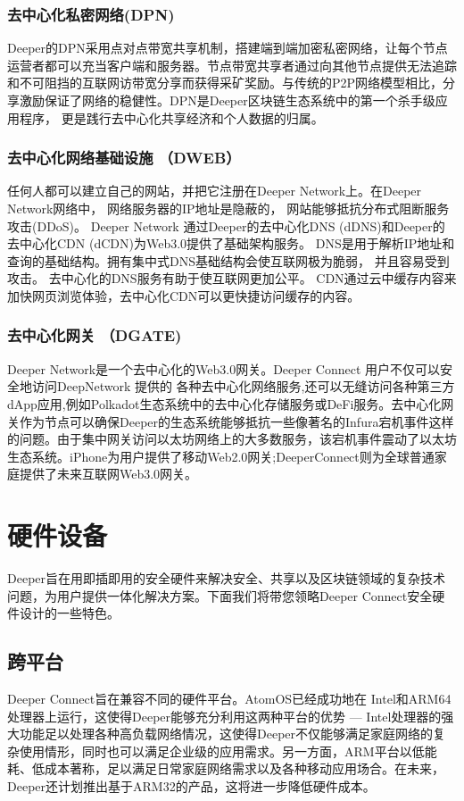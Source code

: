 \documentclass[a4paper]{article}
\begin{document}
\subsubsection{去中心化私密网络(DPN)}
Deeper的DPN采用点对点带宽共享机制，搭建端到端加密私密网络，让每个节点运营者都可以充当客户端和服务器。节点带宽共享者通过向其他节点提供无法追踪和不可阻挡的互联网访带宽分享而获得采矿奖励。与传统的P2P网络模型相比，分享激励保证了网络的稳健性。DPN是Deeper区块链生态系统中的第一个杀手级应用程序， 更是践行去中心化共享经济和个人数据的归属。


\subsubsection{去中心化网络基础设施 （DWEB）}
任何人都可以建立自己的网站，并把它注册在Deeper Network上。在Deeper Network网络中， 网络服务器的IP地址是隐蔽的， 网站能够抵抗分布式阻断服务攻击(DDoS)。 Deeper Network 通过Deeper的去中心化DNS (dDNS)和Deeper的去中心化CDN (dCDN)为Web3.0提供了基础架构服务。 DNS是用于解析IP地址和查询的基础结构。拥有集中式DNS基础结构会使互联网极为脆弱， 并且容易受到攻击。 去中心化的DNS服务有助于使互联网更加公平。 CDN通过云中缓存内容来加快网页浏览体验，去中心化CDN可以更快捷访问缓存的内容。

\subsubsection{去中心化网关 （DGATE)}
Deeper Network是一个去中心化的Web3.0网关。Deeper Connect 用户不仅可以安全地访问DeepNetwork 提供的
各种去中心化网络服务,还可以无缝访问各种第三方dApp应用,例如Polkadot生态系统中的去中心化存储服务或DeFi服务。去中心化网关作为节点可以确保Deeper的生态系统能够抵抗一些像著名的Infura宕机事件这样的问题。由于集中网关访问以太坊网络上的大多数服务，该宕机事件震动了以太坊生态系统。iPhone为用户提供了移动Web2.0网关;DeeperConnect则为全球普通家庭提供了未来互联网Web3.0网关。

\newpage
\section{硬件设备}
Deeper旨在用即插即用的安全硬件来解决安全、共享以及区块链领域的复杂技术问题，为用户提供一体化解决方案。下面我们将带您领略Deeper Connect安全硬件设计的一些特色。

\subsection{跨平台}
Deeper Connect旨在兼容不同的硬件平台。AtomOS已经成功地在 Intel和ARM64处理器上运行，这使得Deeper能够充分利用这两种平台的优势 --- Intel处理器的强大功能足以处理各种高负载网络情况，这使得Deeper不仅能够满足家庭网络的复杂使用情形，同时也可以满足企业级的应用需求。另一方面，ARM平台以低能耗、低成本著称，足以满足日常家庭网络需求以及各种移动应用场合。在未来，Deeper还计划推出基于ARM32的产品，这将进一步降低硬件成本。
\end{document}
